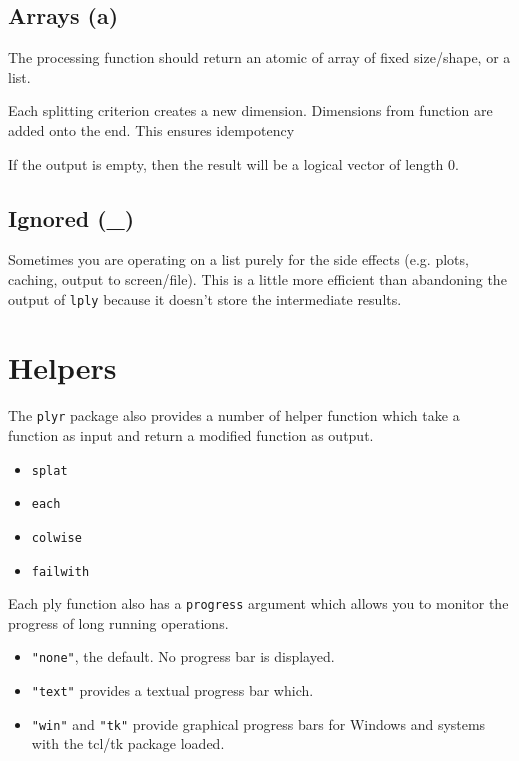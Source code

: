 \documentclass[letterpaper,oneside]{scrartcl}
\begin{document}
\subsection{Arrays (a)}

The processing function should return an atomic of array of fixed size/shape, or a list.  

Each splitting criterion creates a new dimension.  Dimensions from function are added onto the end.  This ensures idempotency

If the output is empty, then the result will be a logical vector of length 0.

\subsection{Ignored (\_)}

Sometimes you are operating on a list purely for the side effects (e.g. plots, caching, output to screen/file).  This is a little more efficient than abandoning the output of {\tt *lply} because it doesn't store the intermediate results.

\section{Helpers}
\label{sec:helpers}

The {\tt plyr} package also provides a number of helper function which take a function as input and return a modified function as output.

\begin{itemize}
  \item {\tt splat}
  \item {\tt each}
  \item {\tt colwise}
  \item {\tt failwith}
\end{itemize}

Each ply function also has a {\tt progress} argument which allows you to monitor the progress of long running operations.  

\begin{itemize}
  \item {\tt "none"}, the default.  No progress bar is displayed.
  \item {\tt "text"} provides a textual progress bar which.
  \item {\tt "win"} and {\tt "tk"} provide graphical progress bars for Windows and systems with the tcl/tk package loaded.
\end{itemize}
\end{document}
